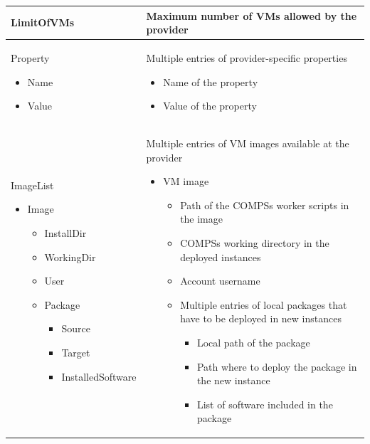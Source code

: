 \begin{longtable}{| p{} | p{} |}
  \hline
  LimitOfVMs	&	Maximum number of VMs allowed by the provider	\\
  
  \hline
  Property
  \begin{itemize}
    \item Name
    \item Value
  \end{itemize}
  &
  Multiple entries of provider-specific properties
  \begin{itemize}
    \item Name of the property
    \item Value of the property
  \end{itemize}
  \\
  \hline
  
  ImageList
  \begin{itemize}
  \item Image
  \begin{itemize}
    \item InstallDir
    \item WorkingDir
    \item User
    \item Package
    \begin{itemize}
    \item Source
    \item Target
    \item InstalledSoftware
    \end{itemize}
  \end{itemize}
  \end{itemize}
  & 
  Multiple entries of VM images available at the provider
  \begin{itemize}
    \item VM image
    \begin{itemize}
      \item Path of the COMPSs worker scripts in the image
      \item COMPSs working directory in the deployed instances
      \item Account username
      \item Multiple entries of local packages that have to be deployed in new instances
      \begin{itemize}
	\item Local path of the package
	\item Path where to deploy the package in the new instance
	\item List of software included in the package
      \end{itemize}
    \end{itemize}
  \end{itemize}
  \\
  \hline
  

\end{longtable}
